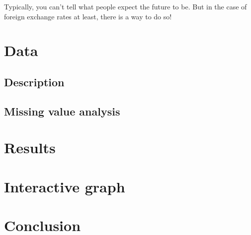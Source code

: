 \documentclass[
  letterpaper,
]{book}
\begin{document}
Typically, you can't tell what people expect the future to be. But in
the case of foreign exchange rates at least, there is a way to do so!


\chapter{Data}\label{data}

\section{Description}\label{description}

\section{Missing value analysis}\label{missing-value-analysis}


\chapter{Results}\label{results}


\chapter{Interactive graph}\label{interactive-graph}

\label{plot}


\chapter{Conclusion}\label{conclusion}


\backmatter

\printindex
\end{document}
